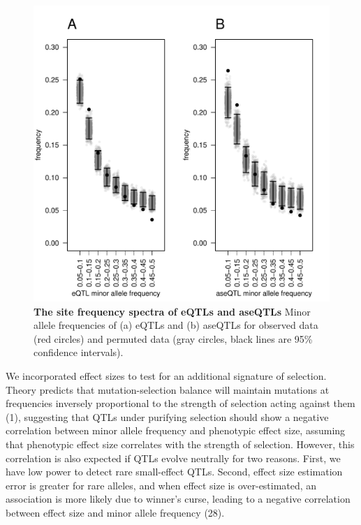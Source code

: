 \begin{figure}[h!]
      \centering
       \includegraphics[width=\linewidth]{Ch3Fig3}
    \caption{\textbf{The site frequency spectra of eQTLs and aseQTLs} Minor allele frequencies of (a) eQTLs and (b) aseQTLs for observed data (red circles) and permuted data (gray circles, black lines are 95\% confidence intervals).}
    \label{fig:3fig3}
\end{figure}

We incorporated effect sizes to test for an additional signature of selection. Theory predicts that mutation-selection balance will maintain mutations at frequencies inversely proportional to the strength of selection acting against them (1), suggesting that QTLs under purifying selection should show a negative correlation between minor allele frequency and phenotypic effect size, assuming that phenotypic effect size correlates with the strength of selection. However, this correlation is also expected if QTLs evolve neutrally for two reasons. First, we have low power to detect rare small-effect QTLs. Second, effect size estimation error is greater for rare alleles, and when effect size is over-estimated, an association is more likely due to winner’s curse, leading to a negative correlation between effect size and minor allele frequency (28). 

